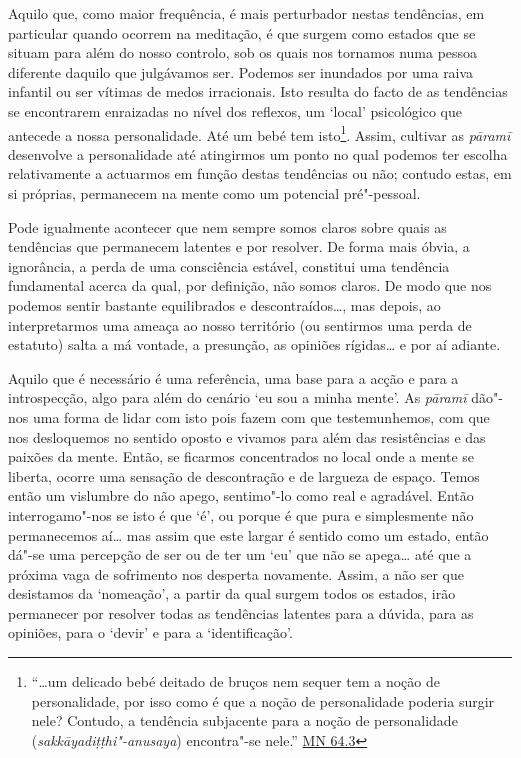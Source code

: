 Aquilo que, como maior frequência, é mais perturbador nestas tendências, em particular quando ocorrem na meditação, é que surgem como estados que se situam para além do nosso controlo, sob os quais nos tornamos numa pessoa diferente daquilo que julgávamos ser. Podemos ser inundados por uma raiva infantil ou ser vítimas de medos irracionais. Isto resulta do facto de as tendências se encontrarem enraizadas no nível dos reflexos, um `local' psicológico que antecede a nossa personalidade. Até um bebé tem isto\footnote{``\ldots um delicado bebé deitado de bruços nem sequer tem a noção de \textquotesingle personalidade\textquotesingle, por isso como é que a noção de personalidade poderia surgir nele? Contudo, a tendência subjacente para a noção de personalidade (\emph{sakkāyadiṭṭhi"-anusaya}) encontra"-se nele.'' \href{https://suttacentral.net/mn64/en/bodhi}{MN 64.3}}. Assim, cultivar as \emph{pāramī} desenvolve a personalidade até atingirmos um ponto no qual podemos ter escolha relativamente a actuarmos em função destas tendências ou não; contudo estas, em si próprias, permanecem na mente como um potencial pré"-pessoal.

Pode igualmente acontecer que nem sempre somos claros sobre quais as tendências que permanecem latentes e por resolver. De forma mais óbvia, a ignorância, a perda de uma consciência estável, constitui uma tendência fundamental acerca da qual, por definição, não somos claros. De modo que nos podemos sentir bastante equilibrados e descontraídos\ldots{}, mas depois, ao interpretarmos uma ameaça ao nosso território (ou sentirmos uma perda de estatuto) salta a má vontade, a presunção, as opiniões rígidas\ldots{} e por aí adiante.

Aquilo que é necessário é uma referência, uma base para a acção e para a introspecção, algo para além do cenário `eu sou a minha mente'. As \emph{pāramī} dão"-nos uma forma de lidar com isto pois fazem com que testemunhemos, com que nos desloquemos no sentido oposto e vivamos para além das resistências e das paixões da mente. Então, se ficarmos concentrados no local onde a mente se liberta, ocorre uma sensação de descontração e de largueza de espaço. Temos então um vislumbre do não apego, sentimo"-lo como real e agradável. Então interrogamo"-nos se isto é que `é', ou porque é que pura e simplesmente não permanecemos aí\ldots{} mas assim que este largar é sentido como um estado, então dá"-se uma percepção de ser ou de ter um `eu' que não se apega\ldots{} até que a próxima vaga de sofrimento nos desperta novamente. Assim, a não ser que desistamos da `nomeação', a partir da qual surgem todos os estados, irão permanecer por resolver todas as tendências latentes para a dúvida, para as opiniões, para o `devir' e para a `identificação'.

